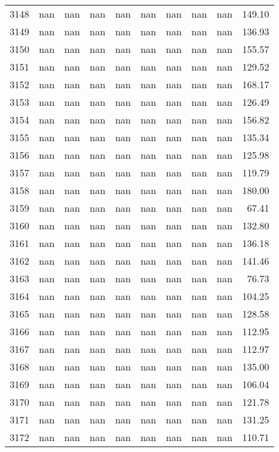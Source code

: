 \begin{tabular}{lrrrrrrrrr}
3148 & nan & nan & nan & nan & nan & nan & nan & nan & 149.10 \\
3149 & nan & nan & nan & nan & nan & nan & nan & nan & 136.93 \\
3150 & nan & nan & nan & nan & nan & nan & nan & nan & 155.57 \\
3151 & nan & nan & nan & nan & nan & nan & nan & nan & 129.52 \\
3152 & nan & nan & nan & nan & nan & nan & nan & nan & 168.17 \\
3153 & nan & nan & nan & nan & nan & nan & nan & nan & 126.49 \\
3154 & nan & nan & nan & nan & nan & nan & nan & nan & 156.82 \\
3155 & nan & nan & nan & nan & nan & nan & nan & nan & 135.34 \\
3156 & nan & nan & nan & nan & nan & nan & nan & nan & 125.98 \\
3157 & nan & nan & nan & nan & nan & nan & nan & nan & 119.79 \\
3158 & nan & nan & nan & nan & nan & nan & nan & nan & 180.00 \\
3159 & nan & nan & nan & nan & nan & nan & nan & nan & 67.41 \\
3160 & nan & nan & nan & nan & nan & nan & nan & nan & 132.80 \\
3161 & nan & nan & nan & nan & nan & nan & nan & nan & 136.18 \\
3162 & nan & nan & nan & nan & nan & nan & nan & nan & 141.46 \\
3163 & nan & nan & nan & nan & nan & nan & nan & nan & 76.73 \\
3164 & nan & nan & nan & nan & nan & nan & nan & nan & 104.25 \\
3165 & nan & nan & nan & nan & nan & nan & nan & nan & 128.58 \\
3166 & nan & nan & nan & nan & nan & nan & nan & nan & 112.95 \\
3167 & nan & nan & nan & nan & nan & nan & nan & nan & 112.97 \\
3168 & nan & nan & nan & nan & nan & nan & nan & nan & 135.00 \\
3169 & nan & nan & nan & nan & nan & nan & nan & nan & 106.04 \\
3170 & nan & nan & nan & nan & nan & nan & nan & nan & 121.78 \\
3171 & nan & nan & nan & nan & nan & nan & nan & nan & 131.25 \\
3172 & nan & nan & nan & nan & nan & nan & nan & nan & 110.71 \\

\end{tabular}
